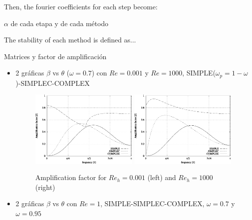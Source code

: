 \documentclass[final,3p,times,10pt,onecolumn]{myElsarticle}
\numberwithin{equation}{section}
\begin{document}
Then, the fourier coefficients for each step become:

{\color{red}
$\alpha$ de cada etapa y de cada método
}

The stability of each method is defined as...

{\color{red}
Matrices y factor de amplificación
}


\begin{itemize}
    \item 2 gráficas $\beta$ vs $\theta$ ($\omega=0.7$) con $Re=0.001$ y $Re=1000$, SIMPLE($\omega_p=1-\omega$)-SIMPLEC-COMPLEX
    
    \begin{figure}[H]
        \centering
        \includegraphics[width=0.49\textwidth]{fig/Re0001}
        \includegraphics[width=0.49\textwidth]{fig/Re1000}
        \caption{Amplification factor for $Re_h=0.001$ (left) and $Re_h=1000$ (right)}
        \label{fig:1a}
    \end{figure}
    
    \item 2 gráficas $\beta$ vs $\theta$ con $Re=1$, SIMPLE-SIMPLEC-COMPLEX, $\omega=0.7$ y $\omega=0.95$
    

\end{itemize}
\end{document}
